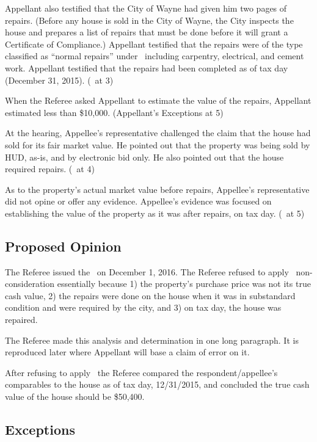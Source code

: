 \documentclass[12pt,\documentclassflag]{michiganCourtOfAppealsBrief}
\def\mathieuGast{\pincite[l]{MCL}{211.27(2)}}
\begin{document}
Appellant also testified that the City of Wayne had given him two pages of repairs. (Before any house is sold in the City of Wayne, the City inspects the house and prepares a list of repairs that must be done before it will grant a Certificate of Compliance.) Appellant testified that the repairs were of the type classified as ``normal repairs'' under \mathieuGast\ including carpentry, electrical, and cement work. Appellant testified that the repairs had been completed as of tax day (December 31, 2015). (\POJ\ at 3)

When the Referee asked Appellant to estimate the value of the repairs, Appellant estimated less than \$10,000. (Appellant's Exceptions at 5)

At the hearing, Appellee's representative challenged the claim that the house had sold for its fair market value. He pointed out that the property was being sold by HUD, as-is, and by electronic bid only. He also pointed out that the house required repairs. (\POJ\ at 4)

As to the property's actual market value before repairs, Appellee's representative did not opine or offer any evidence. Appellee's evidence was focused on establishing the value of the property as it was after repairs, on tax day. (\POJ\ at 5)

\subsection{Proposed Opinion}

The Referee issued the \POJ\ on December 1, 2016. The Referee refused to apply \mathieuGast\ non-consideration essentially because 1) the property's purchase price was not its true cash value, 2) the repairs were done on the house when it was in substandard condition and were required by the city,  and 3) on tax day, the house was repaired.

The Referee made this analysis and determination in one long paragraph. It is reproduced later where Appellant will base a claim of error on it.

After refusing to apply \mathieuGast\ the Referee compared the respondent/appellee's comparables to the house as of tax day, 12/31/2015, and concluded the true cash value of the house should be \$50,400. 

\subsection{Exceptions}
\end{document}
